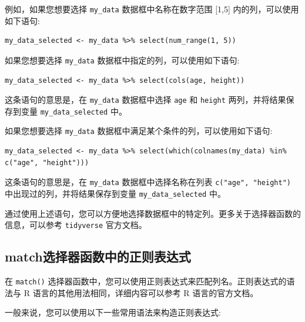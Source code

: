 \documentclass[
  letterpaper,
  DIV=11,
  numbers=noendperiod]{scrreprt}
\begin{document}
例如，如果您想要选择 \texttt{my\_data} 数据框中名称在数字范围 {[}1,5{]}
内的列，可以使用如下语句:

\begin{verbatim}
my_data_selected <- my_data %>% select(num_range(1, 5))
\end{verbatim}

如果您想要选择 \texttt{my\_data} 数据框中指定的列，可以使用如下语句:

\begin{verbatim}
my_data_selected <- my_data %>% select(cols(age, height))
\end{verbatim}

这条语句的意思是，在 \texttt{my\_data} 数据框中选择 \texttt{age} 和
\texttt{height} 两列，并将结果保存到变量 \texttt{my\_data\_selected}
中。

如果您想要选择 \texttt{my\_data}
数据框中满足某个条件的列，可以使用如下语句:

\begin{verbatim}
my_data_selected <- my_data %>% select(which(colnames(my_data) %in% c("age", "height")))
\end{verbatim}

这条语句的意思是，在 \texttt{my\_data} 数据框中选择名称在列表
\texttt{c("age",\ "height")} 中出现过的列，并将结果保存到变量
\texttt{my\_data\_selected} 中。

通过使用上述语句，您可以方便地选择数据框中的特定列。更多关于选择器函数的信息，可以参考
\texttt{tidyverse} 官方文档。

\hypertarget{matchux9009ux62e9ux5668ux51fdux6570ux4e2dux7684ux6b63ux5219ux8868ux8fbeux5f0f}{%
\subsection{match选择器函数中的正则表达式}\label{matchux9009ux62e9ux5668ux51fdux6570ux4e2dux7684ux6b63ux5219ux8868ux8fbeux5f0f}}

在 \texttt{match()}
选择器函数中，您可以使用正则表达式来匹配列名。正则表达式的语法与 R
语言的其他用法相同，详细内容可以参考 R 语言的官方文档。

一般来说，您可以使用以下一些常用语法来构造正则表达式:
\end{document}
